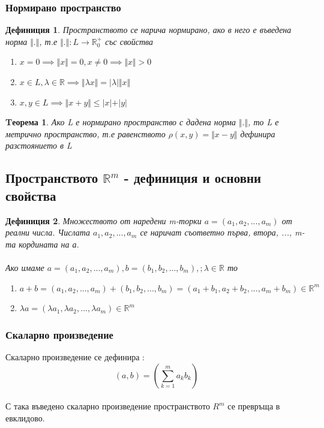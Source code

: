 \documentclass[a4paper,fleqn,12pt]{article}
\newtheorem{theorem}{Tеорема}[subsection]
\newtheorem{definition}{Дефиниция}[subsection]
\theoremstyle{definition}
\begin{document}
\subsubsection{Нормирано пространство}
\begin{definition}
Пространството се нарича нормирано, ако в него е въведена норма $\Vert. \Vert$, т.е $\Vert.\Vert: L \to \mathbb{R}_0^+$ със свойства 
	\begin{enumerate}
 		\item $x = 0  \implies \Vert x \Vert = 0, x \neq 0  \implies \Vert x\Vert > 0$
		\item $x \in L, \lambda \in \mathbb{R} \implies \Vert \lambda x \Vert = \vert \lambda\vert   \Vert x \Vert$
		\item $x,y \in L \implies \Vert x+y\Vert \leq \vert x\vert  + \vert y\vert $
	\end{enumerate}
\end{definition}
\begin{theorem}
Ако L е нормирано пространство с дадена норма $\Vert . \Vert$, то L е метрично пространство, т.е равенството $\rho(x,y) = \Vert x - y \Vert$ дефинира  разстоянието в L
\end{theorem}

\subsection{Пространството $\mathbb{R}^m$ - дефиниция и основни свойства}

\begin{definition}
Множеството от наредени m-торки $a = (a_1, a_2, ... , a_m)$ от реални числа. Числата $a_1, a_2, ... , a_m$ се наричат съответно първа, втора, ..., m-та кордината на а.\\
\\
 Ако имаме $a = (a_1, a_2, ... , a_m), b = (b_1, b_2, ... , b_m), ; \lambda \in \mathbb{R} $ то
	\begin{enumerate}
		\item $a+b =(a_1, a_2, ... , a_m) +  (b_1, b_2, ... , b_m) = (a_1 + b_1, a_2+b_2, ... , a_m + b_m) \in \mathbb{R}^m$
		\item $ \lambda a =(\lambda a_1,\lambda a_2, ... , \lambda a_m) \in \mathbb{R}^m $\\
	\end{enumerate}
\end{definition}

\subsubsection{Скаларно произведение}
Скаларно произведение се дефинира : $$ (a,b) = \left( \sum_{k=1}^{m}a_kb_k \right )$$\\
С така въведено скаларно произведение пространството $R^m$ се превръща в евклидово.
\end{document}
